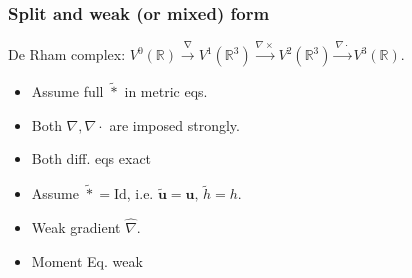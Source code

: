 \documentclass{beamer}
\newcommand{\bbR}{\mathbb{R}}
\begin{document}
\begin{frame}[fragile]\frametitle{Split and weak (or mixed) form}
	De Rham complex: $V^0(\bbR) \xrightarrow{\nabla} V^1(\bbR^3) \xrightarrow{\nabla \times} V^2(\bbR^3) \xrightarrow{\nabla \cdot} V^3(\bbR).$
	\addtolength{\textfloatsep}{-0.8in}
	
	\begin{tcbraster}[raster columns=2, raster equal height]
		\begin{tcolorbox}[width=0.5\textwidth, nobeforeafter, colframe=theme,title=Split form]%
		\begin{itemize}
			\item Assume full $\tilde{*}$ in metric eqs.
			\item Both $\nabla, \nabla \cdot$ are imposed strongly.
			\item Both diff. eqs exact 
		\end{itemize}
		\end{tcolorbox} 
		\begin{tcolorbox}[width=0.5\textwidth, nobeforeafter,  colframe=theme,title=Weak form (Mixed FE)]%
		\begin{itemize}
			\item Assume $\tilde{*}=\text{Id}$, i.e. $\tilde{\mathbf{u}}=\mathbf{u}, \, \tilde{h}=h$.
			\item Weak gradient $\hat{\nabla}$.
			\item Moment Eq. weak
		\end{itemize}
		\end{tcolorbox}
	\end{tcbraster}
	
	
\end{frame}
\end{document}
